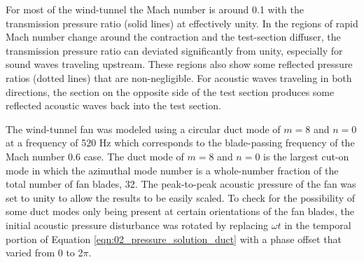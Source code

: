 For most of the wind-tunnel the Mach number is around 0.1 with the transmission pressure ratio (solid lines) at effectively unity.
In the regions of rapid Mach number change around the contraction and the test-section diffuser, the transmission pressure ratio can deviated significantly from unity, especially for sound waves traveling upstream.
These regions also show some reflected pressure ratios (dotted lines) that are non-negligible.
For acoustic waves traveling in both directions, the section on the opposite side of the test section produces some reflected acoustic waves back into the test section.

The wind-tunnel fan was modeled using a circular duct mode of $m=8$ and $n=0$ at a frequency of 520 Hz which corresponds to the blade-passing frequency of the Mach number 0.6 case.
The duct mode of $m=8$ and $n=0$ is the largest cut-on mode in which the azimuthal mode number is a whole-number fraction of the total number of fan blades, 32.
The peak-to-peak acoustic pressure of the fan was set to unity to allow the results to be easily scaled.
To check for the possibility of some duct modes only being present at certain orientations of the fan blades, the initial acoustic pressure disturbance was rotated by replacing $\omega t$ in the temporal portion of Equation \ref{eqn:02_pressure_solution_duct} with a phase offset that varied from 0 to 2$\pi$.


